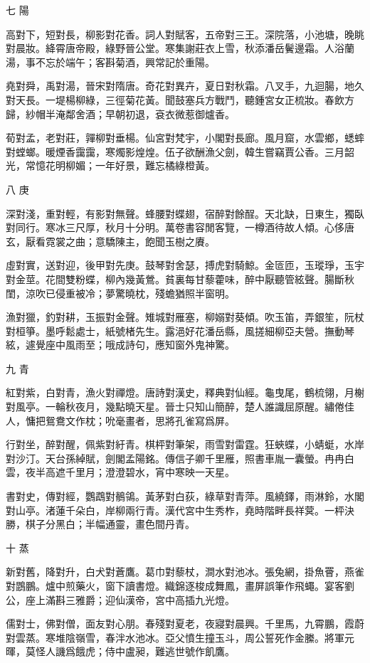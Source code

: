 \documentclass[12pt,a4paper]{ctexbook}
\begin{document}
七 陽\par
高對下，短對長，柳影對花香。詞人對賦客，五帝對三王。深院落，小池塘，晚眺對晨妝。絳霄唐帝殿，綠野晉公堂。寒集謝莊衣上雪，秋添潘岳鬢邊霜。人浴蘭湯，事不忘於端午；客斟菊酒，興常記於重陽。\par
堯對舜，禹對湯，晉宋對隋唐。奇花對異卉，夏日對秋霜。八叉手，九迴腸，地久對天長。一堤楊柳綠，三徑菊花黃。聞鼓塞兵方戰鬥，聽鍾宮女正梳妝。春飲方歸，紗帽半淹鄰舍酒；早朝初退，袞衣微惹御爐香。\par
荀對孟，老對莊，嚲柳對垂楊。仙宮對梵宇，小閣對長廊。風月窟，水雲鄉，蟋蟀對螳螂。暖煙香靄靄，寒燭影煌煌。伍子欲酬漁父劍，韓生嘗竊賈公香。三月韶光，常憶花明柳媚；一年好景，難忘橘綠橙黃。\par
八 庚\par
深對淺，重對輕，有影對無聲。蜂腰對蝶翅，宿醉對餘酲。天北缺，日東生，獨臥對同行。寒冰三尺厚，秋月十分明。萬卷書容閒客覽，一樽酒待故人傾。心侈唐玄，厭看霓裳之曲；意驕陳主，飽聞玉樹之賡。\par
虛對實，送對迎，後甲對先庚。鼓琴對舍瑟，搏虎對騎鯨。金匼匝，玉瑽琤，玉宇對金莖。花間雙粉蝶，柳內幾黃鶯。貧裏每甘藜藿味，醉中厭聽管絃聲。腸斷秋閨，涼吹已侵重被冷；夢驚曉枕，殘蟾猶照半窗明。\par
漁對獵，釣對耕，玉振對金聲。雉城對雁塞，柳嫋對葵傾。吹玉笛，弄銀笙，阮杖對桓箏。墨呼鬆處士，紙號楮先生。露浥好花潘岳縣，風搓細柳亞夫營。撫動琴絃，遽覺座中風雨至；哦成詩句，應知窗外鬼神驚。\par
九 青\par
紅對紫，白對青，漁火對禪燈。唐詩對漢史，釋典對仙經。龜曳尾，鶴梳翎，月榭對風亭。一輪秋夜月，幾點曉天星。晉士只知山簡醉，楚人誰識屈原醒。繡倦佳人，慵把鴛鴦文作枕；吮毫畫者，思將孔雀寫爲屏。\par
行對坐，醉對醒，佩紫對紆青。棋枰對筆架，雨雪對雷霆。狂蛺蝶，小蜻蜓，水岸對沙汀。天台孫綽賦，劍閣孟陽銘。傳信子卿千里雁，照書車胤一囊螢。冉冉白雲，夜半高遮千里月；澄澄碧水，宵中寒映一天星。\par
書對史，傳對經，鸚鵡對鶺鴒。黃茅對白荻，綠草對青萍。風繞鐸，雨淋鈴，水閣對山亭。渚蓮千朵白，岸柳兩行青。漢代宮中生秀柞，堯時階畔長祥蓂。一枰決勝，棋子分黑白；半幅通靈，畫色間丹青。\par
十 蒸\par
新對舊，降對升，白犬對蒼鷹。葛巾對藜杖，澗水對池冰。張兔網，掛魚罾，燕雀對鵾鵬。爐中煎藥火，窗下讀書燈。織錦逐梭成舞鳳，畫屏誤筆作飛蠅。宴客劉公，座上滿斟三雅爵；迎仙漢帝，宮中高插九光燈。\par
儒對士，佛對僧，面友對心朋。春殘對夏老，夜寢對晨興。千里馬，九霄鵬，霞蔚對雲蒸。寒堆陰嶺雪，春泮水池冰。亞父憤生撞玉斗，周公誓死作金縢。將軍元暉，莫怪人譏爲餓虎；侍中盧昶，難逃世號作飢鷹。\par
\end{document}
